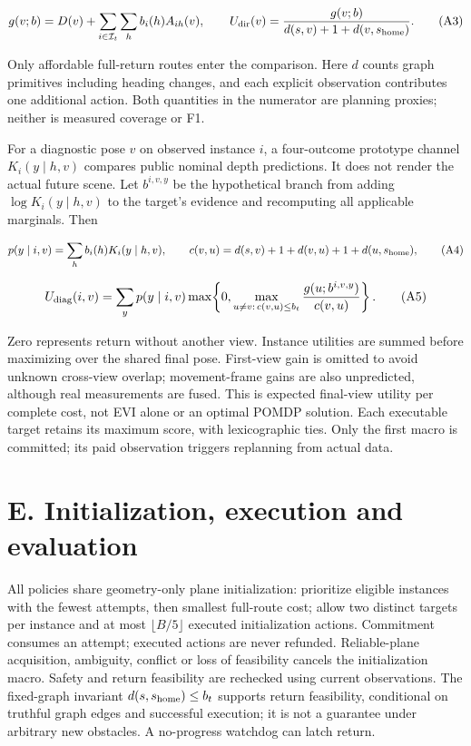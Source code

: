 \documentclass[11pt,a4paper]{article}
\begin{document}
\[
g(v;b)=D(v)+\sum_{i\in\mathcal I_t}\sum_h b_i(h)A_{ih}(v),\qquad
U_{\rm dir}(v)=\frac{g(v;b)}{d(s,v)+1+d(v,s_{\rm home})}.
\tag{A3}
\]

Only affordable full-return routes enter the comparison. Here \(d\) counts graph primitives including heading changes, and each explicit observation contributes one additional action. Both quantities in the numerator are planning proxies; neither is measured coverage or F1.

For a diagnostic pose \(v\) on observed instance \(i\), a four-outcome prototype channel \(K_i(y\mid h,v)\) compares public nominal depth predictions. It does not render the actual future scene. Let \(b^{i,v,y}\) be the hypothetical branch from adding \(\log K_i(y\mid h,v)\) to the target's evidence and recomputing all applicable marginals. Then

\[
p(y\mid i,v)=\sum_h b_i(h)K_i(y\mid h,v),\qquad
c(v,u)=d(s,v)+1+d(v,u)+1+d(u,s_{\rm home}),
\tag{A4}
\]

\[
U_{\rm diag}(i,v)=\sum_y p(y\mid i,v)
\max\!\left\{0,\max_{u\ne v:\,c(v,u)\le b_t}
\frac{g(u;b^{i,v,y})}{c(v,u)}\right\}.
\tag{A5}
\]

Zero represents return without another view. Instance utilities are summed before maximizing over the shared final pose. First-view gain is omitted to avoid unknown cross-view overlap; movement-frame gains are also unpredicted, although real measurements are fused. This is expected final-view utility per complete cost, not EVI alone or an optimal POMDP solution. Each executable target retains its maximum score, with lexicographic ties. Only the first macro is committed; its paid observation triggers replanning from actual data.

\hypertarget{e.-initialization-execution-and-evaluation}{%
\section*{E. Initialization, execution and evaluation}\label{e.-initialization-execution-and-evaluation}}

All policies share geometry-only plane initialization: prioritize eligible instances with the fewest attempts, then smallest full-route cost; allow two distinct targets per instance and at most \(\lfloor B/5\rfloor\) executed initialization actions. Commitment consumes an attempt; executed actions are never refunded. Reliable-plane acquisition, ambiguity, conflict or loss of feasibility cancels the initialization macro. Safety and return feasibility are rechecked using current observations. The fixed-graph invariant \(d(s,s_{\rm home})\le b_t\) supports return feasibility, conditional on truthful graph edges and successful execution; it is not a guarantee under arbitrary new obstacles. A no-progress watchdog can latch return.
\end{document}
